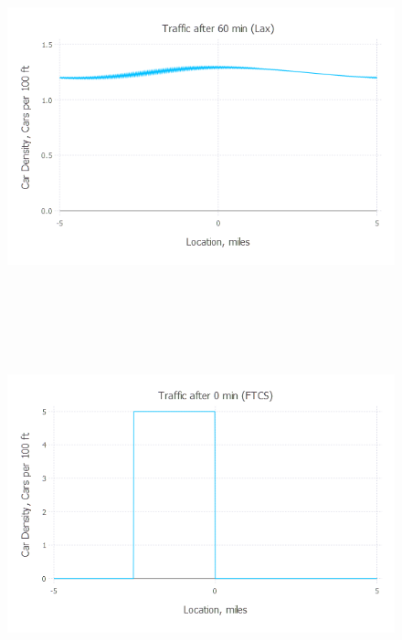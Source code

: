 \documentclass{article}
\begin{document}
\begin{figure}[H]
	\includegraphics[width=6in,height=4in]{"Traffic after 60 min (Lax)"}
\end{figure}
\begin{figure}[H]
	\includegraphics[width=6in,height=4in]{"Traffic after 0 min (FTCS)"}
\end{figure}
\end{document}
